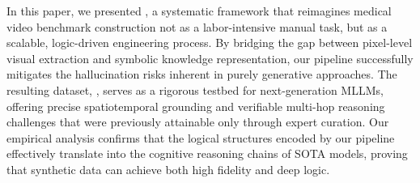 In this paper, we presented \PipelineName, a systematic framework that reimagines medical video benchmark construction not as a labor-intensive manual task, but as a scalable, logic-driven engineering process. By bridging the gap between pixel-level visual extraction and symbolic knowledge representation, our pipeline successfully mitigates the hallucination risks inherent in purely generative approaches. 
The resulting dataset, \BenchmarkName, serves as a rigorous testbed for next-generation MLLMs, offering precise spatiotemporal grounding and verifiable multi-hop reasoning challenges that were previously attainable only through expert curation.
Our empirical analysis confirms that the logical structures encoded by our pipeline effectively translate into the cognitive reasoning chains of SOTA models, proving that synthetic data can achieve both high fidelity and deep logic.
